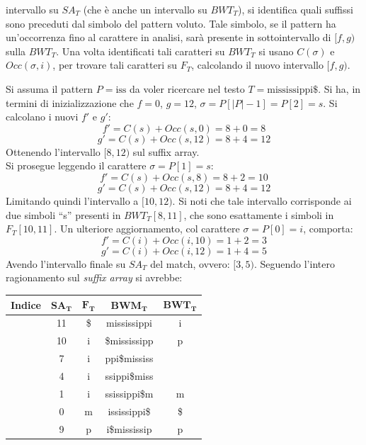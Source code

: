 intervallo su $SA_T$ (che è anche un intervallo su $BWT_T$), si identifica quali
suffissi sono preceduti dal simbolo del pattern voluto. Tale simbolo, se il
pattern ha un'occorrenza fino al carattere in analisi, sarà presente in
sottointervallo di $[f,g)$ sulla $BWT_T$. Una volta identificati tali caratteri
su $BWT_T$ si usano $C(\sigma)$ e $Occ(\sigma, i)$, per trovare tali caratteri
su $F_T$, calcolando il nuovo intervallo $[f,g)$.
\begin{esempio}
  Si assuma il pattern $P=\mbox{iss}$ da voler ricercare nel testo
  $T=\mbox{mississippi\$}$. 
  Si ha, in termini di inizializzazione che $f=0$, $g=12$,
  $\sigma=P[|P|-1]=P[2]=s$. Si calcolano i nuovi $f'$ e $g'$:
  \[f'=C(s)+Occ(s, 0)=8+0=8\]
  \[g'=C(s)+Occ(s, 12)=8+4=12\]
  Ottenendo l'intervallo $[8,12)$ sul suffix array.\\
  Si prosegue leggendo il carattere $\sigma=P[1]=s$:
  \[f'=C(s)+Occ(s, 8)=8+2=10\]
  \[g'=C(s)+Occ(s, 12)=8+4=12\]
  Limitando quindi l'intervallo a $[10,12)$. Si noti che tale intervallo
  corrisponde ai due simboli ``s'' presenti in $BWT_T[8,11]$, che sono
  esattamente i simboli in $F_T[10,11]$.
  Un ulteriore aggiornamento, col carattere $\sigma=P[0]=i$, comporta:
  \[f'=C(i)+Occ(i, 10)=1+2=3\]
  \[g'=C(i)+Occ(i, 12)=1+4=5\]
  Avendo l'intervallo finale su $SA_T$ del match, ovvero: $[3,5)$.
  Seguendo l'intero ragionamento sul \textit{suffix array} si avrebbe:
  \begin{table}[H]
    \centering
    \scriptsize
    \begin{tabular}{c|c|c|c|c} 
      \textbf{Indice} & $\mathbf{SA_T}$ & $\mathbf{F_T}$ & $\mathbf{BWM_T}$
      & $\mathbf{BWT_T}$\\ 
      \hline
      {\color{nordred}{0}} & 11 & \$ & {\color{nordred}{\$}}mississippi & i\\
      {\color{nordred}{1}} & 10 & i & {\color{nordred}{i}}\$mississipp & p\\
      {\color{nordred}{2}} & 7 & i & {\color{nordred}{i}}ppi\$mississ
      & {\color{nordgreen}{s}}\\
      {\color{nordred}{3}} & 4 & i & {\color{nordred}{i}}ssippi\$miss
      & {\color{nordgreen}{s}}\\
      {\color{nordred}{4}} & 1 & i & {\color{nordred}{i}}ssissippi\$m & m\\
      {\color{nordred}{5}} & 0 & m & {\color{nordred}{m}}ississippi\$ & \$\\
      {\color{nordred}{6}} & 9 & p & {\color{nordred}{p}}i\$mississip & p\\

\end{tabular}
\end{table}
\end{esempio}
